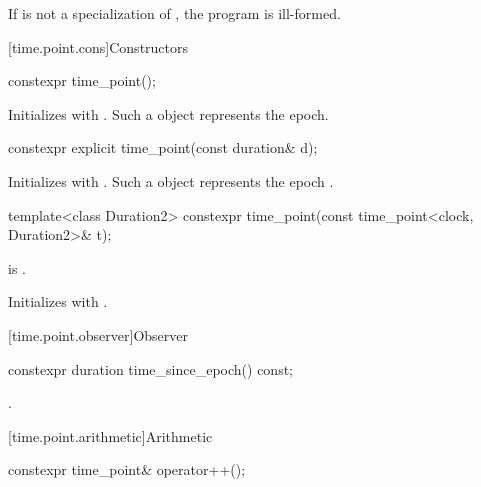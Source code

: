 \pnum
If  is not a specialization of ,
the program is ill-formed.

[time.point.cons]{Constructors}

%
\begin{itemdecl}
constexpr time_point();
\end{itemdecl}

\begin{itemdescr}
\pnum
\effects
Initializes  with .
Such a  object represents the epoch.
\end{itemdescr}

%
\begin{itemdecl}
constexpr explicit time_point(const duration& d);
\end{itemdecl}

\begin{itemdescr}
\pnum
\effects
Initializes  with .
Such a  object represents the epoch .
\end{itemdescr}

%
\begin{itemdecl}
template<class Duration2>
  constexpr time_point(const time_point<clock, Duration2>& t);
\end{itemdecl}

\begin{itemdescr}
\pnum
\constraints
{} is .

\pnum
\effects
Initializes  with .
\end{itemdescr}

[time.point.observer]{Observer}

%
\begin{itemdecl}
constexpr duration time_since_epoch() const;
\end{itemdecl}

\begin{itemdescr}
\pnum
\returns
{}.
\end{itemdescr}

[time.point.arithmetic]{Arithmetic}

%
\begin{itemdecl}
constexpr time_point& operator++();
\end{itemdecl}

